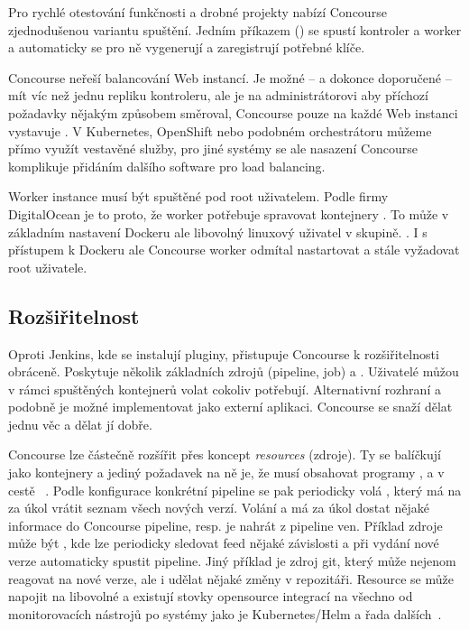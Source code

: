         Pro rychlé otestování funkčnosti a drobné projekty nabízí Concourse zjednodušenou variantu spuštění. Jedním příkazem () se spustí kontroler a worker a automaticky se pro ně vygenerují a zaregistrují potřebné klíče.

        Concourse neřeší balancování Web instancí. Je možné -- a dokonce doporučené -- mít víc než jednu repliku kontroleru, ale je na administrátorovi aby příchozí požadavky nějakým způsobem směroval, Concourse pouze na každé Web instanci vystavuje  . V Kubernetes, OpenShift nebo podobném orchestrátoru můžeme přímo využít vestavěné služby, pro jiné systémy se ale nasazení Concourse komplikuje přidáním dalšího software pro load balancing.

        Worker instance musí být spuštěné pod root uživatelem. Podle firmy DigitalOcean je to proto, že worker potřebuje spravovat kontejnery . To může v základním nastavení Dockeru ale libovolný linuxový uživatel v  skupině. . I s přístupem k Dockeru ale Concourse worker odmítal nastartovat a stále vyžadovat root uživatele.

    \subsection{Rozšiřitelnost}
        Oproti Jenkins, kde se instalují pluginy, přistupuje Concourse k rozšiřitelnosti obráceně. Poskytuje několik základních zdrojů (pipeline, job) a . Uživatelé můžou v rámci spuštěných kontejnerů volat cokoliv potřebují. Alternativní rozhraní a podobně je možné implementovat jako externí aplikaci. Concourse se snaží dělat jednu věc a dělat jí dobře.

        Concourse lze částečně rozšířit přes koncept \textit{resources} (zdroje). Ty se balíčkují jako kontejnery a jediný požadavek na ně je, že musí obsahovat programy ,  a  v cestě ~\cite{concourse-resource}. Podle konfigurace konkrétní pipeline se pak periodicky volá , který má na za úkol vrátit seznam všech nových verzí. Volání  a  má za úkol dostat nějaké informace do Concourse pipeline, resp. je nahrát z pipeline ven. Příklad zdroje může být , kde lze periodicky sledovat feed nějaké závislosti a při vydání nové verze automaticky spustit pipeline. Jiný příklad je zdroj git, který může nejenom reagovat na nové verze, ale i udělat nějaké změny v repozitáři. Resource se může napojit na libovolné  a existují stovky opensource integrací na všechno od monitorovacích nástrojů po \CD systémy jako je Kubernetes/Helm a řada dalších~\cite{concourse-resource-list}.

